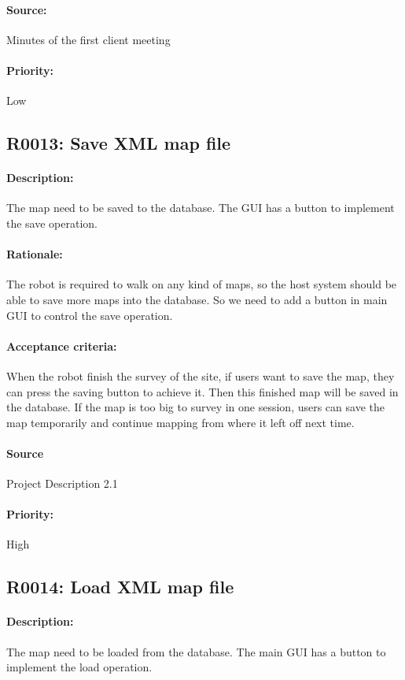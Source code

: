 \documentclass[11pt, a4paper]{report}
\begin{document}
\paragraph{Source:}
 Minutes of the first client meeting 
\paragraph{Priority:}
Low



\subsection{R0013: Save XML map file}
\paragraph{Description:}
The map need to be saved to the database. The GUI has a button to implement the save operation. 
\paragraph{Rationale:}
The robot is required to walk on any kind of maps, so the host system should be able to save more maps into the database. So we need to add a button in main GUI to control the save operation.
\paragraph{Acceptance criteria:}
When the robot finish the survey of the site, if users want to save the map, they can press the saving button to achieve it.  Then this finished map will be saved in the database. If the map is too big to survey in one session, users can save the map temporarily and continue mapping from where it left off next time.
\paragraph{Source}
 Project Description 2.1
\paragraph{Priority:}
High




\subsection{R0014: Load XML map file}
\paragraph{Description:}
The map need to be loaded from the database. The main GUI has a button to implement the load operation. 
\end{document}
